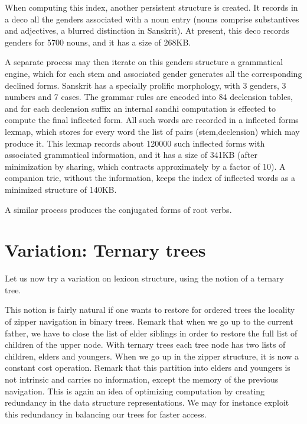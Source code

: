 \documentclass[12pt]{article}
\begin{document}
When computing this index, another persistent structure is created. It
records in a deco all the genders associated with a noun entry
(nouns comprise substantives and adjectives, a blurred distinction in
Sanskrit). 
At present, this deco records genders for 5700 nouns, and it has
a size of 268KB. 

A separate process may then iterate on this genders structure a 
grammatical engine, which for each stem and associated gender generates
all the corresponding declined forms. Sanskrit has a specially 
prolific morphology, with 3 genders, 3 numbers and 7 cases. The grammar
rules are encoded into 84 declension tables, and for each declension 
suffix an internal sandhi computation is effected to compute the final 
inflected form. All such words are recorded in a inflected forms lexmap,
which stores for every word the list of
pairs (stem,declension) which may produce it. This lexmap records
about 120000 such inflected forms with associated grammatical
information, and it has a size of 341KB (after minimization by sharing, 
which contracts approximately by a factor of 10). 
A companion trie, without the information, keeps the index of inflected words 
as a minimized structure of 140KB. 

A similar process produces the conjugated forms of root verbs. 

\section{Variation: Ternary trees}

Let us now try a variation on lexicon structure, using the notion of a
ternary tree.

This notion is fairly natural if one wants to restore for ordered trees
the locality of zipper navigation in binary trees. Remark that when we
go up to the current father, we have to close the list of elder siblings
in order to restore the full list of children of the upper node.
With ternary trees each tree node has two lists of children, elders and 
youngers. When we go up in the zipper structure, it is now a constant
cost operation. Remark that this partition into elders and youngers is
not intrinsic and carries no information, except the memory of the previous
navigation. This is again an idea of optimizing computation by
creating redundancy in the data structure representations. We may for instance 
exploit this redundancy in balancing our trees for faster access. 
\end{document}
